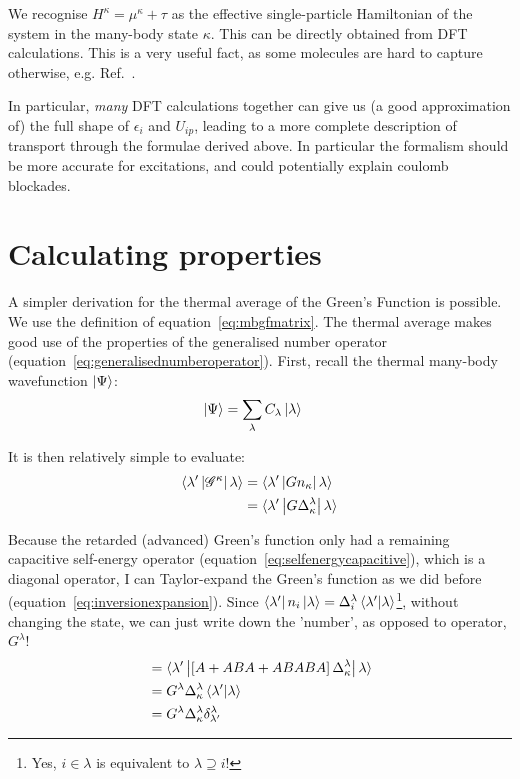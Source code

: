 We recognise $H^\kappa = \mu^\kappa + \tau$ as the effective single-particle Hamiltonian of the system in the many-body state $\kappa$. This can be directly obtained from DFT calculations. This is a very useful fact, as some molecules are hard to capture otherwise, e.g. Ref.~\cite{frisenda}.

In particular, \emph{many} DFT calculations together can give us (a good approximation of) the full shape of $\epsilon_i$ and $U_{ip}$, leading to a more complete description of transport through the formulae derived above. In particular the formalism should be more accurate for excitations, and could potentially explain coulomb blockades.

\section{Calculating properties}
\label{sec:calcprop}
A simpler derivation for the thermal average of the Green's Function is possible. We use the definition of equation~\ref{eq:mbgfmatrix}. The thermal average makes good use of the properties of the generalised number operator (equation~\ref{eq:generalisednumberoperator}). First, recall the thermal many-body wavefunction $\ket{\Psi}$:
\begin{align*}
\ket{\Psi} &= \sum_\lambda C_\lambda \ket{\lambda}
\end{align*}

It is then relatively simple to evaluate:
\begin{align*}
\braket{\lambda^\prime \left| \mathscr{G}^\kappa \right| \lambda } &= 
\braket{\lambda^\prime \left|  G n_\kappa \right| \lambda } \\
&= \braket{\lambda^\prime \left| G \Delta^\lambda_\kappa \right| \lambda }
\end{align*}

Because the retarded (advanced) Green's function only had a remaining capacitive self-energy operator (equation~\ref{eq:selfenergycapacitive}), which is a diagonal operator, I can Taylor-expand the Green's function as we did before (equation~\ref{eq:inversionexpansion}). Since $\bra{\lambda'}n_i \ket{\lambda}=\Delta^\lambda_i\braket{\lambda'|\lambda}$\footnote{Yes, $i \in \lambda$ is equivalent to $\lambda\supseteq i$!}, without changing the state, we can just write down the 'number', as opposed to operator,  $G^\lambda$! 
\begin{align*}
&= \braket{\lambda^\prime \left| \left[ A + ABA + ABABA \right] \Delta^\lambda_\kappa \right| \lambda } \\
&=  G^\lambda \Delta^\lambda_\kappa \braket{\lambda^\prime | \lambda }\\
&=  G^\lambda \Delta^\lambda_\kappa \delta^\lambda_{\lambda^\prime}
\end{align*}

